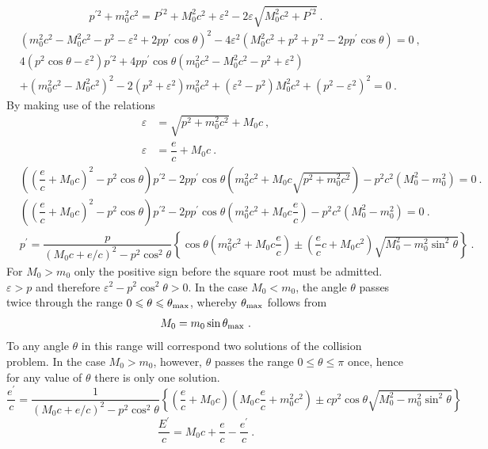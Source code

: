 \documentclass[11pt,a4paper]{article}
\begin{document}
\begin{equation*}
p^{\prime 2} +m_0^2 c^2 = P^{\prime 2} +M_0^2 c^2 +\varepsilon^2 -2\varepsilon \sqrt{M_0^2 c^2 +P^{\prime 2} } ~.
\end{equation*}
\begin{align*}
& (m_0^2 c^2-M_0^2 c^2-p^2 -\varepsilon^2 +2 p p^\prime \cos \theta)^2 - 4\varepsilon^2 (M_0^2 c^2 +p^2 +p^{\prime 2} - 2p p^\prime \cos \theta) = 0 ~, \\
& 4(p^2 \cos \theta-\varepsilon^2) p^{\prime 2} +4 p p^\prime \cos\theta (m_0^2 c^2 -M_0^2 c^2 -p^2 +\varepsilon^2) \\
& +(m_0^2 c^2 -M_0^2 c^2)^2 -2(p^2 +\varepsilon^2)m_0^2 c^2 +(\varepsilon^2 -p^2) M_0^2 c^2 +(p^2 -\varepsilon^2)^2 = 0 ~.
\end{align*}
By making use of the relations
\begin{align}
\varepsilon &= \sqrt{p^2 +m_0^2 c^2} +M_0 c ~, \\
\varepsilon &= \dfrac{e}{c} +M_0 c ~.
\end{align}
\begin{align}
\nonumber & \left(\left(\dfrac{e}{c} +M_0c \right)^2 -p^2 \cos \theta \right) p^{\prime 2} -2 p p^\prime \cos \theta \left(m_0^2 c^2 +M_0 c\sqrt{p^2 +m_0^2 c^2} \right) -p^2 c^2 (M_0^2 -m_0^2) = 0 ~. \\
\nonumber & \left(\left(\dfrac{e}{c} +M_0c \right)^2 -p^2 \cos \theta \right) p^{\prime 2} -2 p p^\prime \cos \theta \left(m_0^2 c^2 +M_0 c\dfrac{e}{c} \right) -p^2 c^2 (M_0^2 -m_0^2) = 0 ~. \\
& p^\prime = \dfrac{p}{(M_0c +e/c)^2 -p^2 \cos^2 \theta} \left\{\cos \theta \left(m_0^2 c^2  +M_0 c \dfrac{e}{c} \right) \pm \left(\dfrac{e}{c} c +M_0 c^2 \right) \sqrt{M_0^2 -m_0^2 \sin^2 \theta}   \right\} ~.
\end{align}
For $M_0 > m_0$ only the positive sign before the square root must be admitted. $\varepsilon > p$ and therefore $\varepsilon^2 -p^2 \cos^2 \theta > 0$. In the case $M_0 < m_0$, the angle $\theta$ passes twice through the range $0 \leqslant \theta \leqslant \theta_{\rm max}$, whereby $\theta_{\rm max}$ follows from
\begin{equation*}
M_0 = m_0 \sin \theta_{\rm max} ~.
\end{equation*}
To any angle $\theta$ in this range will correspond two solutions of the collision problem. In the case $M_0 > m_0$, however, $\theta$ passes the range $0 \leqslant \theta \leqslant \pi$ once, hence for any value of $\theta$ there is only one solution.
\begin{equation}
\dfrac{e^\prime}{c} = \dfrac{1}{(M_0c+e/c)^2 -p^2 \cos^2 \theta} \left\{\left(\dfrac{e}{c} +M_0 c \right) \left(M_0 c\dfrac{e}{c} +m_0^2 c^2 \right) \pm cp^2 \cos \theta \sqrt{M_0^2 -m_0^2 \sin^2 \theta}  \right\}
\end{equation}
\begin{equation}
\dfrac{E^\prime}{c} = M_0 c +\dfrac{e}{c}  -\dfrac{e^\prime}{c} ~.
\end{equation}
\end{document}
